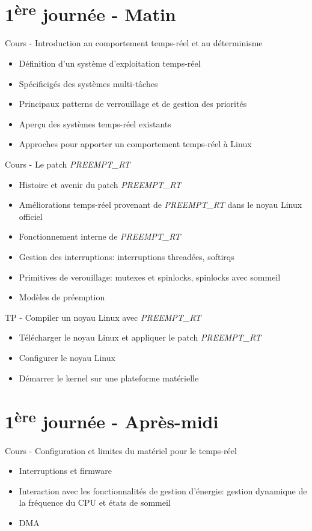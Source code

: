 \documentclass[a4paper,12pt,obeyspaces,spaces,hyphens]{article}
\begin{document}
\section{1\textsuperscript{ère} journée - Matin}

\feagendaonecolumn
{Cours - Introduction au comportement temps-réel et au déterminisme}
{
  \begin{itemize}
  \item Définition d'un système d'exploitation temps-réel
  \item Spécificigés des systèmes multi-tâches
  \item Principaux patterns de verrouillage et de gestion des priorités
  \item Aperçu des systèmes temps-réel existants
  \item Approches pour apporter un comportement temps-réel à Linux
  \end{itemize}
}

\feagendatwocolumn
{Cours - Le patch {\em PREEMPT\_RT}}
{
  \begin{itemize}
  \item Histoire et avenir du patch {\em PREEMPT\_RT}
  \item Améliorations temps-réel provenant de {\em PREEMPT\_RT} dans le noyau Linux officiel
  \item Fonctionnement interne de {\em PREEMPT\_RT}
  \item Gestion des interruptions: interruptions threadées, softirqs
  \item Primitives de verouillage: mutexes et spinlocks, spinlocks avec sommeil
  \item Modèles de préemption
  \end{itemize}
}
{TP - Compiler un noyau Linux avec {\em PREEMPT\_RT}}
{
  \begin{itemize}
  \item Télécharger le noyau Linux et appliquer le patch {\em PREEMPT\_RT}
  \item Configurer le noyau Linux
  \item Démarrer le kernel sur une plateforme matérielle
 \end{itemize}
}

\section{1\textsuperscript{ère} journée - Après-midi}

\feagendaonecolumn
{Cours - Configuration et limites du matériel pour le temps-réel}
{
  \begin{itemize}
  \item Interruptions et firmware
  \item Interaction avec les fonctionnalités de gestion d'énergie:
    gestion dynamique de la fréquence du CPU et états de sommeil
  \item DMA
  \end{itemize}
}
\end{document}
